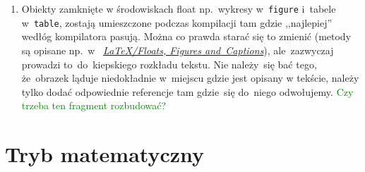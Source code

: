 \documentclass[a4paper,11pt]{article}
\newcommand{\toadd}[1]{\textcolor{green}{#1}}
\begin{document}
\begin{enumerate}
  Jeśli teraz \LaTeX{} stwierdzi, że~jest błąd w~jakimś miejscu
  tekstu, a~ty nie możesz znaleźć miejsca gdzie on~dokładnie jest
  (wskazania kompilatora~są często bardzo mało dokładne), proponujemy
  postępować w~następujący sposób. Zakomentuj możliwie mały blok
  tekstu wokół miejsca w~którym wskazany jest błąd, tak by~plik
  zaczął~się ponownie kompilować. Następnie odkomentowuj ten tekst
  porcjami do~momentu, aż~błąd pojawi~się znowu. Teraz już wiesz,
  że~musi być w~ostatnim odkomentowany fragmencie.

  Jeśli w~tym fragmencie dalej nie jesteś w~stanie go znaleźć, spróbuj
  powtórzyć opisaną wyżej procedurę na~nim. I~tak do momentu, aż~go
  znajdziesz. Życzymy powodzenia~\smiley.
\item Obiekty zamknięte w środowiskach float np.~wykresy
  w~\texttt{figure} i~tabele w~\texttt{table}, zostają umieszczone
  podczas kompilacji tam gdzie ,,najlepiej'' wedłóg kompilatora
  pasują. Można co prawda starać się to zmienić (metody są opisane
  np.~w~
  \href{https://en.wikibooks.org/wiki/LaTeX/Floats,\_Figures\_and\_Captions}{\emph{\LaTeX/Floats,
      Figures and~Captions}}), ale~zazwyczaj prowadzi to~do~kiepskiego
  rozkładu tekstu. Nie należy~się bać tego, że~obrazek ląduje
  niedokładnie w~miejscu gdzie jest opisany w tekście, należy tylko
  dodać odpowiednie referencje tam gdzie~się do~niego odwołujemy.
  \toadd{Czy trzeba ten fragment rozbudować?}
\end{enumerate}





\section{Tryb matematyczny}
\label{sec:trybmatematyczny}
\end{document}

